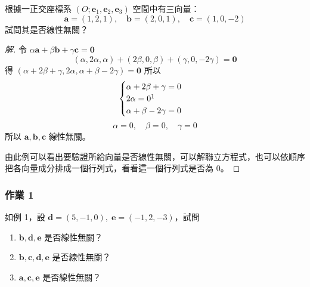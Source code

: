 \begin{example}[例 1]
根據一正交座標系 $(O; \mathbf{e}_1, \mathbf{e}_2, \mathbf{e}_3)$ 空間中有三向量：
\[ \mathbf{a} = (1, 2, 1),\quad \mathbf{b} = (2, 0, 1),\quad \mathbf{c} = (1, 0, -2) \]
試問其是否線性無關？
\end{example}
\begin{proof}[解]
令 $\alpha \mathbf{a} + \beta \mathbf{b} + \gamma \mathbf{c} = \mathbf{0}$
\[ (\alpha, 2\alpha, \alpha) + (2\beta, 0, \beta) + (\gamma, 0, -2\gamma) = \mathbf{0} \]
得 $(\alpha + 2\beta + \gamma, 2\alpha, \alpha + \beta - 2\gamma) = \mathbf{0}$
所以
\label{note:b3s-ch5-p230-2alpha-typo}
\[ \begin{cases} \alpha + 2\beta + \gamma = 0 \\ 2\alpha = 0\footnotemark \\ \alpha + \beta - 2\gamma = 0 \end{cases} \]
\[ \alpha = 0,\quad \beta = 0,\quad \gamma = 0 \]
所以 $\mathbf{a}, \mathbf{b}, \mathbf{c}$ 線性無關。

由此例可以看出要驗證所給向量是否線性無關，可以解聯立方程式，也可以依順序把各向量成分排成一個行列式，看看這一個行列式是否為 0。
\end{proof}

\subsubsection*{作業 1}
如例 1，設 $\mathbf{d} = (5, -1, 0),\; \mathbf{e} = (-1, 2, -3)$，試問
\begin{enumerate}[label=(\roman*), leftmargin=2.5em]
  \item $\mathbf{b}, \mathbf{d}, \mathbf{e}$ 是否線性無關？
  \item $\mathbf{b}, \mathbf{c}, \mathbf{d}, \mathbf{e}$ 是否線性無關？
  \item $\mathbf{a}, \mathbf{c}, \mathbf{e}$ 是否線性無關？
\end{enumerate}

